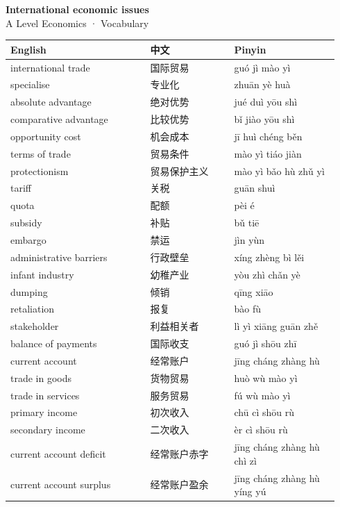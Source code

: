 \documentclass[11pt]{article}
\begin{document}
\begin{center}
  {\LARGE\bfseries International economic issues}\\[0.35em]
  {\large A Level Economics · Vocabulary}
\end{center}
\vspace{0.6em}

\begin{longtable}{@{}p{0.40\linewidth}p{0.24\linewidth}p{0.30\linewidth}@{}}
\toprule
\textbf{English} & \textbf{中文} & \textbf{Pinyin} \\
\midrule
\endhead
\bottomrule
\endlastfoot
international trade & 国际贸易 & guó jì mào yì \\
specialise & 专业化 & zhuān yè huà \\
absolute advantage & 绝对优势 & jué duì yōu shì \\
comparative advantage & 比较优势 & bǐ jiào yōu shì \\
opportunity cost & 机会成本 & jī huì chéng běn \\
terms of trade & 贸易条件 & mào yì tiáo jiàn \\
protectionism & 贸易保护主义 & mào yì bǎo hù zhǔ yì \\
tariff & 关税 & guān shuì \\
quota & 配额 & pèi é \\
subsidy & 补贴 & bǔ tiē \\
embargo & 禁运 & jìn yùn \\
administrative barriers & 行政壁垒 & xíng zhèng bì lěi \\
infant industry & 幼稚产业 & yòu zhì chǎn yè \\
dumping & 倾销 & qīng xiāo \\
retaliation & 报复 & bào fù \\
stakeholder & 利益相关者 & lì yì xiāng guān zhě \\
balance of payments & 国际收支 & guó jì shōu zhī \\
current account & 经常账户 & jīng cháng zhàng hù \\
trade in goods & 货物贸易 & huò wù mào yì \\
trade in services & 服务贸易 & fú wù mào yì \\
primary income & 初次收入 & chū cì shōu rù \\
secondary income & 二次收入 & èr cì shōu rù \\
current account deficit & 经常账户赤字 & jīng cháng zhàng hù chì zì \\
current account surplus & 经常账户盈余 & jīng cháng zhàng hù yíng yú \\

\end{longtable}
\end{document}
